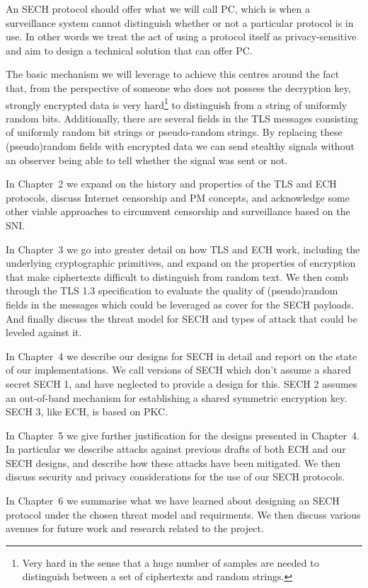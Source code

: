 
An \ac{SECH} protocol should
offer what we will call \ac{PC},
which is when a surveillance system cannot distinguish whether or not
a particular protocol is in use.
In other words we treat the act of using a protocol itself as privacy-sensitive
and aim to design a technical solution that can offer \ac{PC}.

The basic mechanism we will leverage to achieve this centres around
the fact that,
from the perspective of someone
who does not possess the decryption key,
strongly encrypted data is very hard\footnote{Very hard in the sense that a huge number of samples are needed to distinguish between a set of ciphertexts and random strings.} to distinguish from
a string of uniformly random bits.
Additionally, there are several fields in the \ac{TLS}
messages consisting of uniformly random bit strings or pseudo-random strings.
By replacing these (pseudo)random fields with encrypted data we can send
stealthy signals without an observer being able to tell whether the signal was sent or not.

In Chapter~2 we expand on the history and properties of
the \ac{TLS} and \ac{ECH} protocols,
discuss Internet censorship and \ac{PM} concepts,
and acknowledge some other viable approaches to
circumvent censorship and surveillance based on the \ac{SNI}.

In Chapter~3 we go into greater detail on how \ac{TLS}
and \ac{ECH} work,
including the underlying cryptographic primitives,
and expand on the properties of encryption that
make ciphertexts difficult to distinguish from random text.
We then comb through the \ac{TLS} 1.3 specification
to evaluate the quality of (pseudo)random fields in the messages
which could be leveraged as cover for the \ac{SECH} payloads.
And finally discuss the threat model for \ac{SECH}
and types of attack that could be leveled against it.

In Chapter~4 we describe our designs for \ac{SECH} in detail
and report on the state of our implementations.
We call versions of \ac{SECH} which don't assume a shared secret \ac{SECH} 1, and have neglected to provide a design for this.
\ac{SECH} 2 assumes an out-of-band
mechanism for establishing a shared symmetric encryption key. \ac{SECH} 3, like \ac{ECH}, is based on \ac{PKC}.

In Chapter~5 we give further justification for the designs presented in
Chapter~4.
In particular we describe attacks against previous drafts of both \ac{ECH}
and our \ac{SECH} designs, and describe how these attacks have been mitigated.
We then discuss security and privacy considerations for the use of our \ac{SECH} protocols.

In Chapter~6 we summarise what we have learned about designing
an \ac{SECH} protocol under the chosen threat model and requirments. We then discuss
various avenues for future work and research related to the project.